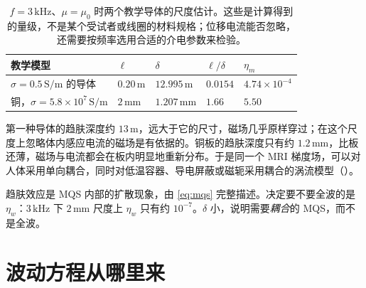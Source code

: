 \begin{table}[htbp]\centering\small
\caption{$f=3\,\mathrm{kHz}$、$\mu=\mu_0$ 时两个教学导体的尺度估计。这些是计算得到的量级，不是某个受试者或线圈的材料规格；位移电流能否忽略，还需要按频率选用合适的介电参数来检验。}\label{tab:regimes-3khz}
\begin{tabularx}{\linewidth}{@{}Y l l l l@{}}
\toprule
教学模型 & $\ell$ & $\delta$ & $\ell/\delta$ & $\eta_m$\\\midrule
$\sigma=0.5\,\mathrm{S/m}$ 的导体 & $0.20\,\mathrm m$ & $12.995\,\mathrm m$ & $0.0154$ & $4.74\times10^{-4}$\\
铜，$\sigma=5.8\times10^7\,\mathrm{S/m}$ & $2\,\mathrm{mm}$ & $1.207\,\mathrm{mm}$ & $1.66$ & $5.50$\\
\bottomrule
\end{tabularx}
\end{table}

第一种导体的趋肤深度约 $13\,\mathrm m$，远大于它的尺寸，磁场几乎原样穿过；在这个尺度上忽略体内感应电流的磁场是有依据的。铜板的趋肤深度只有约 $1.2\,\mathrm{mm}$，比板还薄，磁场与电流都会在板内明显地重新分布。于是同一个 MRI 梯度场，可以对人体采用单向耦合，同时对低温容器、导电屏蔽或磁轭采用耦合的涡流模型（）。


\begin{pitfall}
趋肤效应是 MQS 内部的扩散现象，由 \eqref{eq:mqs} 完整描述。决定要不要全波的是 $\eta_w$：$3\,\mathrm{kHz}$ 下 $2\,\mathrm{mm}$ 尺度上 $\eta_w$ 只有约 $10^{-7}$。$\delta$ 小，说明需要\emph{耦合}的 MQS，而不是全波。
\end{pitfall}

\section{波动方程从哪里来}\label{sec:regimes-wave}

